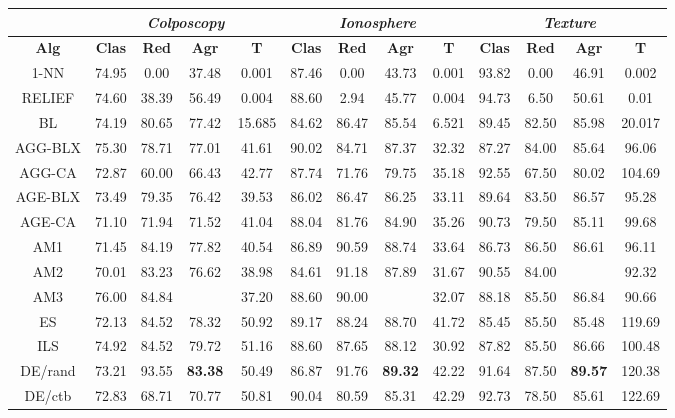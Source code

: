 \documentclass[12pt]{article}
\begin{document}
\begin{table}[h]
\begin{tabular}{ccccc|cccc|cccc}
\centering
 & \multicolumn{4}{c}{\textit{Colposcopy}} & \multicolumn{4}{c}{\textit{Ionosphere}} & \multicolumn{4}{c}{\textit{Texture}} \\ \hline
\textbf{Alg} & \textbf{Clas} & \textbf{Red} & \textbf{Agr} & \textbf{T} & \textbf{Clas} & \textbf{Red} & \textbf{Agr} & \textbf{T} & \textbf{Clas} & \textbf{Red} & \textbf{Agr} & \textbf{T} \\ \hline
1-NN & 74.95 & 0.00 & 37.48 & 0.001 & 87.46 & 0.00 & 43.73 & 0.001 & 93.82 & 0.00 & 46.91 & 0.002\\
RELIEF & 74.60 & 38.39 & 56.49 & 0.004 & 88.60 & 2.94 & 45.77 & 0.004 & 94.73 & 6.50 & 50.61 & 0.01\\
BL & 74.19 & 80.65 & 77.42 & 15.685 & 84.62 & 86.47 & 85.54 & 6.521 & 89.45 & 82.50 & 85.98 & 20.017\\
AGG-BLX & 75.30 & 78.71 & 77.01 & 41.61 & 90.02 & 84.71 & 87.37 & 32.32  & 87.27 & 84.00 & 85.64 & 96.06 \\
AGG-CA & 72.87 & 60.00 & 66.43 & 42.77 & 87.74 & 71.76 & 79.75 & 35.18 & 92.55 & 67.50 & 80.02 & 104.69 \\
AGE-BLX & 73.49 & 79.35 & 76.42 & 39.53 & 86.02 & 86.47 & 86.25 & 33.11 & 89.64 & 83.50 & 86.57 & 95.28 \\
AGE-CA & 71.10 & 71.94 & 71.52 & 41.04 & 88.04 & 81.76 & 84.90 & 35.26 & 90.73 & 79.50 & 85.11 & 99.68 \\
AM1 & 71.45 & 84.19 & 77.82 & 40.54 & 86.89 & 90.59 & 88.74 & 33.64 & 86.73 & 86.50 & 86.61 & 96.11 \\
AM2 & 70.01 & 83.23 & 76.62 & 38.98 & 84.61 & 91.18 & 87.89 & 31.67 & 90.55 & 84.00 & {\color{red}{87.27}} & 92.32 \\
AM3 & 76.00 & 84.84 & {\color{red}{80.42}} & 37.20 & 88.60 & 90.00 & {\color{red}{89.30}} & 32.07 & 88.18 & 85.50 & 86.84 & 90.66 \\
ES & 72.13 & 84.52 & 78.32 & 50.92 & 89.17 & 88.24 & {\color{blue}88.70} & 41.72 & 85.45 & 85.50 & 85.48 & 119.69\\
ILS & 74.92 & 84.52 & {\color{blue}79.72} & 51.16  & 88.60 & 87.65 & 88.12 & 30.92  & 87.82 & 85.50 & {\color{blue}86.66} & 100.48\\
DE/rand & 73.21 & 93.55 & \textbf{83.38} & 50.49 & 86.87 & 91.76 & \textbf{89.32} & 42.22 & 91.64 & 87.50 & \textbf{89.57} & 120.38\\
DE/ctb & 72.83 & 68.71 & 70.77 & 50.81 & 90.04 & 80.59 & 85.31 & 42.29 & 92.73 & 78.50 & 85.61 & 122.69
\end{tabular}
\end{table}
\end{document}
